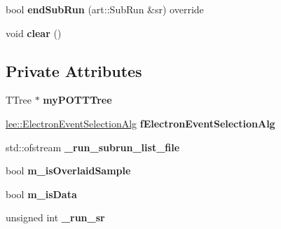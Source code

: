 \begin{DoxyCompactItemize}
\item 
\hypertarget{classlee_1_1ElectronNeutrinoFilter_a85815554f7381b9ececc94a83ee86859}{bool {\bfseries end\-Sub\-Run} (art\-::\-Sub\-Run \&sr) override}\label{classlee_1_1ElectronNeutrinoFilter_a85815554f7381b9ececc94a83ee86859}

\item 
\hypertarget{classlee_1_1ElectronNeutrinoFilter_aff0f9ad8cf9531ac2a743ade4758502c}{void {\bfseries clear} ()}\label{classlee_1_1ElectronNeutrinoFilter_aff0f9ad8cf9531ac2a743ade4758502c}

\end{DoxyCompactItemize}
\subsection*{Private Attributes}
\begin{DoxyCompactItemize}
\item 
\hypertarget{classlee_1_1ElectronNeutrinoFilter_a71f4be7e318ce49ff07a948e17afe40d}{T\-Tree $\ast$ {\bfseries my\-P\-O\-T\-T\-Tree}}\label{classlee_1_1ElectronNeutrinoFilter_a71f4be7e318ce49ff07a948e17afe40d}

\item 
\hypertarget{classlee_1_1ElectronNeutrinoFilter_a218cb05b2710a8cfaa9021cc7850bb28}{\hyperlink{classlee_1_1ElectronEventSelectionAlg}{lee\-::\-Electron\-Event\-Selection\-Alg} {\bfseries f\-Electron\-Event\-Selection\-Alg}}\label{classlee_1_1ElectronNeutrinoFilter_a218cb05b2710a8cfaa9021cc7850bb28}

\item 
\hypertarget{classlee_1_1ElectronNeutrinoFilter_ac9531a2782934676b4a5c5562da3139c}{std\-::ofstream {\bfseries \-\_\-run\-\_\-subrun\-\_\-list\-\_\-file}}\label{classlee_1_1ElectronNeutrinoFilter_ac9531a2782934676b4a5c5562da3139c}

\item 
\hypertarget{classlee_1_1ElectronNeutrinoFilter_acba0453be53b5ce2cdf28552611f6711}{bool {\bfseries m\-\_\-is\-Overlaid\-Sample}}\label{classlee_1_1ElectronNeutrinoFilter_acba0453be53b5ce2cdf28552611f6711}

\item 
\hypertarget{classlee_1_1ElectronNeutrinoFilter_abc078c72f7360f21250dfa5f16eace15}{bool {\bfseries m\-\_\-is\-Data}}\label{classlee_1_1ElectronNeutrinoFilter_abc078c72f7360f21250dfa5f16eace15}

\item 
\hypertarget{classlee_1_1ElectronNeutrinoFilter_a18314044dbcc5e207627d51bf023caa3}{unsigned int {\bfseries \-\_\-run\-\_\-sr}}\label{classlee_1_1ElectronNeutrinoFilter_a18314044dbcc5e207627d51bf023caa3}


\end{DoxyCompactItemize}

